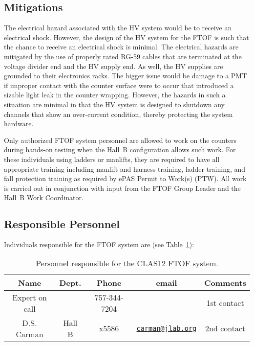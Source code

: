 \subsection{Mitigations}

The electrical hazard associated with the HV system would be to receive an electrical 
shock. However, the design of the HV system for the FTOF is such that the chance to 
receive an electrical shock is minimal. The electrical hazards are mitigated by the use 
of properly rated RG-59 cables that are terminated at the voltage divider end and the HV 
supply end. As well, the HV supplies are grounded to their electronics racks. The bigger 
issue would be damage to a PMT if improper contact with the counter surface were to occur 
that introduced a sizable light leak in the counter wrapping. However, the hazards in such 
a situation are minimal in that the HV system is designed to shutdown any channels that 
show an over-current condition, thereby protecting the system hardware. 

Only authorized FTOF system personnel are allowed to work on the counters during hands-on
testing when the Hall~B configuration allows such work. For these individuals using ladders 
or manlifts, they are required to have all appropriate training including manlift and
harness training, ladder training, and fall protection training as required by ePAS Permit
to Work(s) (PTW).  All work is carried out in conjunction with input from the FTOF Group
Leader and the Hall~B Work Coordinator.

\subsection{Responsible Personnel}

Individuals responsible for the FTOF system are (see Table~\ref{tb:ftof}):

\begin{table}[!htb]
\centering
\begin{tabular}{|c|c|c|c|c|} \hline
Name           & Dept.  & Phone        & email & Comments \\ \hline
Expert on call &        & 757-344-7204 &       & 1st contact \\ \hline
D.S. Carman    & Hall B & x5586 & \href{mailto:carman@jlab.org}{\nolinkurl{carman@jlab.org}} & 2nd contact \\ \hline
\end{tabular}
\caption{Personnel responsible for the CLAS12 FTOF system.} 
\label{tb:ftof}
\end{table}
